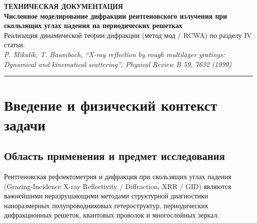 \documentclass[a4paper,11pt]{article}
\begin{document}
\begin{center}
    {\color{primary}\Huge\bfseries ТЕХНИЧЕСКАЯ ДОКУМЕНТАЦИЯ}\\[4mm]
    {\color{secondary}\LARGE\bfseries Численное моделирование дифракции рентгеновского излучения при скользящих углах падения на периодических решетках}\\[3mm]
    {\large Реализация динамической теории дифракции (метод мод / RCWA) по разделу IV статьи:}\\[2mm]
    {\itshape P. Mikulík, T. Baumbach, ``X-ray reflection by rough multilayer gratings: Dynamical and kinematical scattering'', Physical Review B 59, 7632 (1999)}\\[5mm]
    \rule{\linewidth}{1pt}
\end{center}

\vspace{-2mm}
\begin{abstract}
Настоящий документ представляет собой детальное научно-техническое описание и архитектурную документацию программного комплекса \texttt{main.py}. В коде реализован метод связанных волн в строгой формулировке (Rigorous Coupled-Wave Analysis, RCWA), эквивалентный модальному подходу на основе задачи на собственные значения (modal eigenvalue method) динамической теории дифракции рентгеновского излучения при скользящих углах падения (Grazing-Incidence X-ray Diffraction, GID / GIXD / XRR). Рассмотрены физические основы модели, вывод волнового уравнения Гельмгольца в слое с периодической поляризуемостью, алгебраическая спектральная задача, классический метод матриц переноса (Transfer Matrix Method, TMM) и численно устойчивый глобальный блочный метод сшивки полей. Приведено исчерпывающее описание каждой функции исходного кода с указанием параметров, возвращаемых типов, математических соотношений и физического смысла, а также детальный анализ численных результатов и построенных пространственных распределений полей.
\end{abstract}

\vspace{5mm}
\tableofcontents
\newpage

\section{Введение и физический контекст задачи}

\subsection{Область применения и предмет исследования}
Рентгеновская рефлектометрия и дифракция при скользящих углах падения (Grazing-Incidence X-ray Reflectivity / Diffraction, XRR / GID) являются важнейшими неразрушающими методами структурной диагностики наноразмерных полупроводниковых гетероструктур, периодических дифракционных решеток, квантовых проволок и многослойных зеркал. 
\end{document}
